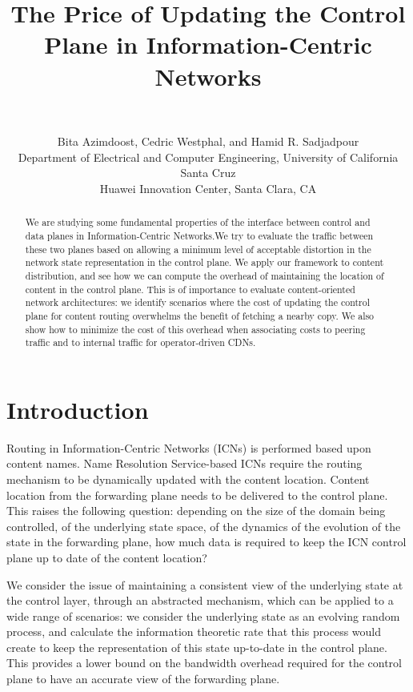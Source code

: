 \documentclass[conference]{IEEEtran}
\theoremstyle{plain}
\theoremstyle{remark}
\begin{document}
\title{The Price of Updating the Control Plane in Information-Centric Networks}

\author{\,}

\author{Bita Azimdoost, Cedric Westphal, and Hamid R. Sadjadpour\\
Department of Electrical and Computer Engineering, 
University of California Santa Cruz\\
 Huawei Innovation Center, Santa Clara, CA
}

\maketitle

\begin{abstract}
We are studying some fundamental properties of the interface between control and data planes in Information-Centric Networks.We try to evaluate the traffic between these two planes based on allowing a minimum level of acceptable distortion in the network state representation in the control plane. We apply our framework to content distribution, and see how we can compute the overhead of maintaining the location of content in the control plane. This is of importance to evaluate content-oriented network architectures: we identify scenarios where the cost of updating the control plane for content routing overwhelms the benefit of fetching a nearby copy. We also show how to minimize the cost of this overhead when associating costs to peering traffic and to internal traffic for operator-driven CDNs.
\end{abstract}

\section{Introduction}

Routing in Information-Centric Networks (ICNs) is performed based upon content names. Name Resolution Service-based ICNs \cite{Ahlgren2012Survey} require the routing mechanism to be dynamically updated with the content location. Content location from the forwarding plane needs to be delivered to the control plane. This raises the following question: depending on the size of the domain being controlled, of the underlying state space, of the dynamics of the evolution of the state in the forwarding plane, how much data is required to keep the ICN control plane up to date of the content location?

We consider the issue of maintaining a consistent view of the underlying state at the control layer, through an abstracted mechanism, which can be applied to a wide range of scenarios: we consider the underlying state as an evolving random  process, and calculate the information theoretic rate that this process would create to keep the representation of this state up-to-date in the control plane. This provides a lower bound on the bandwidth overhead required for the control plane to have an accurate view of the forwarding plane.
\end{document}
